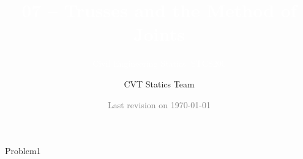 \documentclass[9pt,xcolor={svgnames, x11names}]{beamer}
\title[MoJ]{\Huge \textcolor{white}{07 -- Trusses and the Method of Joints}}
\subtitle[STCS200]{\Large\textcolor{white}{Civil Engineering Statics, STCS200}}
\author{CVT Statics Team}
\institute{\large SAIT Polytechnic}
\date{\small \textcolor{gray}{Last revision on \today}}
\def\scale{1} %
\begin{document}

\begin{frame}[plain]
	\titlepage
\end{frame}



\begin{frame}{Problem1}
	\def\scale{0.65}
	\centering
	
	




\end{frame}







\begin{frame}{}
	\begin{myexer}{}{}
		\def\scale{0.65}
		\centering
		
	\end{myexer}
\end{frame}

%
%
%
%
%
\end{document}
